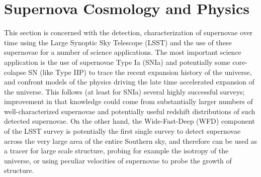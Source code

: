 %
%
%
%
%
%
%

\section{Supernova Cosmology and Physics}
\def\secname{supernovae}\label{sec:\secname}



This section is concerned with the detection, characterization of supernovae 
over time using the Large Synoptic Sky Telescope (LSST) and the use of these
supernovae for a number of science applications. The most important science 
application is the use of supernovae Type Ia (SNIa) and potentially some core-colapse SN (like Type IIP) to trace the recent expansion history of the universe,
and confront models of the physics driving the late time accelerated expansion
of the universe. This follows (at least for SNIa) several highly successful surveys; improvement in that knowledge could come from substantially larger numbers
of well-characterized supernovae and potentially useful redshift distributions
of such detected supernovae. On the other hand, the Wide-Fast-Deep (WFD)
component of the LSST survey is potentially the first single survey to detect
supernovae across the very large area of the entire Southern sky, and therefore
can be used as a tracer for large scale structure, probing for example the isotropy of the universe, or using peculiar velocities of supernovae to probe the growth of structure.


